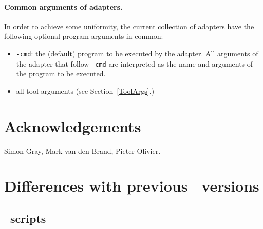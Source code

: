\paragraph{Common arguments of adapters.} In order to achieve some uniformity,
the current collection of adapters have the following optional program arguments
in common:

\begin{itemize}

\item {\tt -cmd}: the (default) program to be executed by the adapter.
All arguments of the adapter that follow {\tt -cmd} are interpreted as
the name and arguments of the program to be executed.

\item all tool arguments (see Section~\ref{ToolArgs}.)
\end{itemize}



\section*{Acknowledgements}
Simon Gray, Mark van den Brand, Pieter Olivier.
\appendix


\newpage
\section{Differences with previous \TB\ versions}

\subsection{\T\ scripts}

